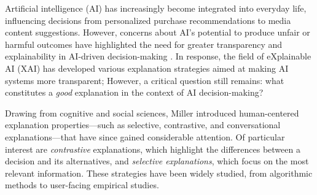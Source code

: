 
Artificial intelligence (AI) has increasingly become integrated into everyday life, influencing decisions from personalized purchase recommendations to media content suggestions. However, concerns about AI's potential to produce unfair or harmful outcomes have highlighted the need for greater transparency and explainability in AI-driven decision-making \cite{lipton2018mythos}. In response, the field of eXplainable AI (XAI) has developed various explanation strategies aimed at making AI systems more transparent; However, a critical question still remains: what constitutes a {\it good} explanation in the context of AI decision-making?

Drawing from cognitive and social sciences, Miller \cite{miller2019explanation} introduced human-centered explanation properties---such as selective, contrastive, and conversational explanations---that have since gained considerable attention. Of particular interest are {\it contrastive} explanations, which highlight the differences between a decision and its alternatives, and {\it selective explanations}, which focus on the most relevant information. These strategies have been widely studied, from algorithmic methods to user-facing empirical studies.

